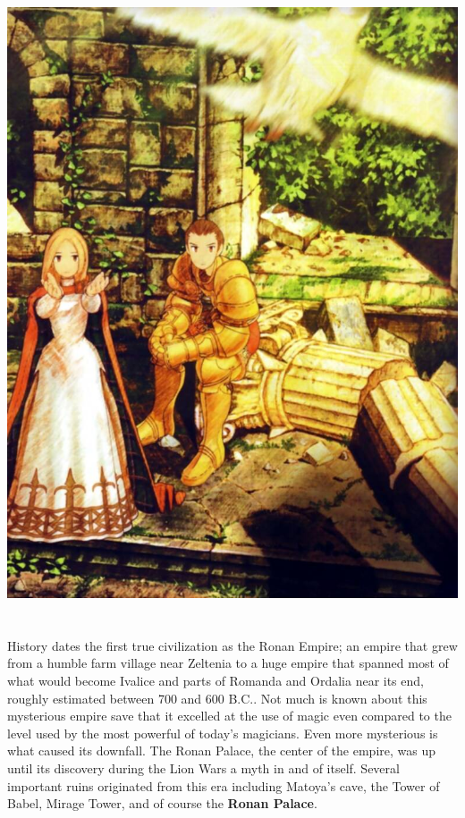 %
\\\\
\includegraphics[width=\columnwidth]{./art/images/ovelia.jpg}
\\\\
%
\\
History dates the first true civilization as the Ronan Empire; an empire that grew from a humble farm village near Zeltenia to a huge empire that spanned most of what would become Ivalice and parts of Romanda and Ordalia near its end, roughly estimated between 700 and 600 B.C.. 
Not much is known about this mysterious empire save that it excelled at the use of magic even compared to the level used by the most powerful of today's magicians. 
Even more mysterious is what caused its downfall. 
The Ronan Palace, the center of the empire, was up until its discovery during the Lion Wars a myth in and of itself. 
Several important ruins originated from this era including Matoya's cave, the Tower of Babel, Mirage Tower, and of course the \textbf{Ronan Palace}. 
